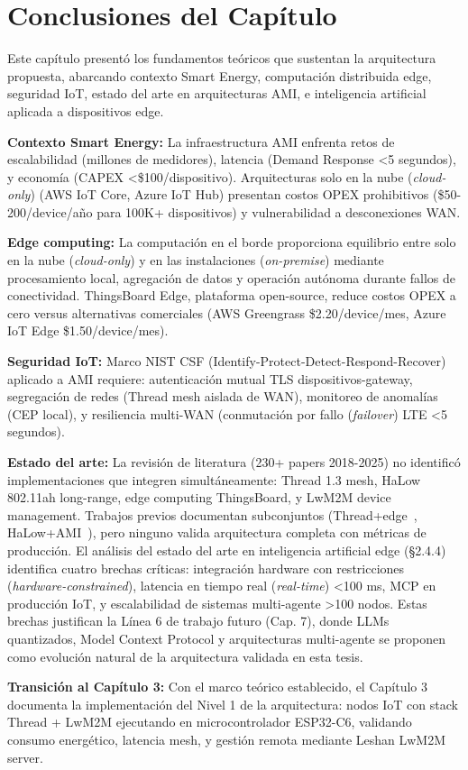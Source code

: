 \section{Conclusiones del Capítulo}
\label{sec:marco-conclusiones}

Este capítulo presentó los fundamentos teóricos que sustentan la arquitectura propuesta, abarcando contexto Smart Energy, computación distribuida edge, seguridad IoT, estado del arte en arquitecturas AMI, e inteligencia artificial aplicada a dispositivos edge.

\textbf{Contexto Smart Energy:} La infraestructura AMI enfrenta retos de escalabilidad (millones de medidores), latencia (Demand Response <5 segundos), y economía (CAPEX <\$100/dispositivo). Arquitecturas solo en la nube (\textit{cloud-only}) (AWS IoT Core, Azure IoT Hub) presentan costos OPEX prohibitivos (\$50-200/device/año para 100K+ dispositivos) y vulnerabilidad a desconexiones WAN.

\textbf{Edge computing:} La computación en el borde proporciona equilibrio entre solo en la nube (\textit{cloud-only}) y en las instalaciones (\textit{on-premise}) mediante procesamiento local, agregación de datos y operación autónoma durante fallos de conectividad. ThingsBoard Edge, plataforma open-source, reduce costos OPEX a cero versus alternativas comerciales (AWS Greengrass \$2.20/device/mes, Azure IoT Edge \$1.50/device/mes).

\textbf{Seguridad IoT:} Marco NIST CSF (Identify-Protect-Detect-Respond-Recover) aplicado a AMI requiere: autenticación mutual TLS dispositivos-gateway, segregación de redes (Thread mesh aislada de WAN), monitoreo de anomalías (CEP local), y resiliencia multi-WAN (conmutación por fallo (\textit{failover}) LTE <5 segundos).

\textbf{Estado del arte:} La revisión de literatura (230+ papers 2018-2025) no identificó implementaciones que integren simultáneamente: Thread 1.3 mesh, HaLow 802.11ah long-range, edge computing ThingsBoard, y LwM2M device management. Trabajos previos documentan subconjuntos (Thread+edge~\cite{shahryarSolutionSmartHome2020}, HaLow+AMI~\cite{sunHaLowBasedWirelessCommunication2019}), pero ninguno valida arquitectura completa con métricas de producción. El análisis del estado del arte en inteligencia artificial edge (§2.4.4) identifica cuatro brechas críticas: integración hardware con restricciones (\textit{hardware-constrained}), latencia en tiempo real (\textit{real-time}) <100 ms, MCP en producción IoT, y escalabilidad de sistemas multi-agente >100 nodos. Estas brechas justifican la Línea 6 de trabajo futuro (Cap. 7), donde LLMs quantizados, Model Context Protocol y arquitecturas multi-agente se proponen como evolución natural de la arquitectura validada en esta tesis.

\textbf{Transición al Capítulo 3:} Con el marco teórico establecido, el Capítulo 3 documenta la implementación del Nivel 1 de la arquitectura: nodos IoT con stack Thread + LwM2M ejecutando en microcontrolador ESP32-C6, validando consumo energético, latencia mesh, y gestión remota mediante Leshan LwM2M server.


